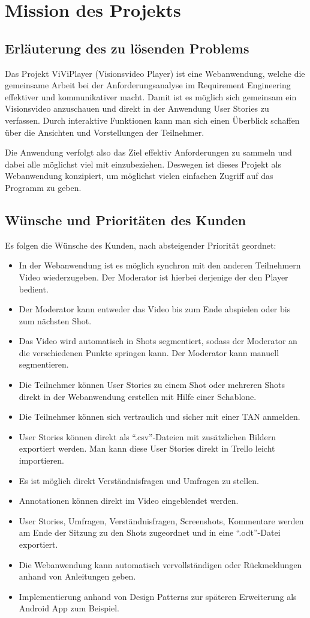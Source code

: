 \section{Mission des Projekts}

\subsection{Erläuterung des zu lösenden Problems}
Das Projekt ViViPlayer (Visionsvideo Player) ist eine Webanwendung, welche die gemeinsame Arbeit 
bei der Anforderungsanalyse im Requirement Engineering effektiver und kommunikativer macht.
Damit ist es möglich sich gemeinsam ein Visionsvideo anzuschauen und direkt in der Anwendung User Stories
zu verfassen. Durch interaktive Funktionen kann man sich einen Überblick schaffen über die Ansichten und Vorstellungen der Teilnehmer.

Die Anwendung verfolgt also das Ziel effektiv Anforderungen zu sammeln und dabei alle möglichst viel mit einzubeziehen.
Deswegen ist dieses Projekt als Webanwendung konzipiert, um möglichst vielen einfachen Zugriff auf das Programm zu geben.

\subsection{Wünsche und Prioritäten des Kunden}
	Es folgen die Wünsche des Kunden, nach absteigender Priorität geordnet:
	\begin{itemize}
		\item In der Webanwendung ist es möglich synchron mit den anderen Teilnehmern Video wiederzugeben. Der Moderator ist hierbei derjenige der den Player bedient.
		\item Der Moderator kann entweder das Video bis zum Ende abspielen oder bis zum nächsten Shot.
		\item Das Video wird automatisch in Shots segmentiert, sodass der Moderator an die verschiedenen Punkte springen kann. Der Moderator kann manuell segmentieren.
		\item Die Teilnehmer können User Stories zu einem Shot oder mehreren Shots direkt in der Webanwendung erstellen mit Hilfe einer Schablone.
		\item Die Teilnehmer können sich vertraulich und sicher mit einer TAN anmelden.
		\item User Stories können direkt als ``.csv''-Dateien mit zusätzlichen Bildern exportiert werden. Man kann diese User Stories direkt in Trello leicht importieren.
		\item Es ist möglich direkt Verständnisfragen und Umfragen zu stellen.
		\item Annotationen können direkt im Video eingeblendet werden.
		\item User Stories, Umfragen, Verständnisfragen, Screenshots, Kommentare werden am Ende der Sitzung zu den Shots zugeordnet und in eine ``.odt''-Datei exportiert.
		\item Die Webanwendung kann automatisch vervollständigen oder Rückmeldungen anhand von Anleitungen geben.
		\item Implementierung anhand von Design Patterns zur späteren Erweiterung als Android App zum Beispiel.
	\end{itemize}

